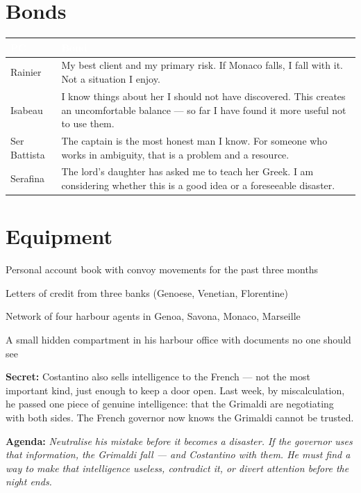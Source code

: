 \section*{Bonds}
\begin{table}[h]\centering\renewcommand{\arraystretch}{1.4}
\begin{tabularx}{\linewidth}{@{}L{2.6cm} X@{}}
\toprule{}
\textcolor{white}{\textbf{PC}} & \textcolor{white}{\textbf{Bond}} \\
\midrule
Rainier & My best client and my primary risk. If Monaco falls, I fall with it. Not a situation I enjoy. \\
Isabeau & I know things about her I should not have discovered. This creates an uncomfortable balance --- so far I have found it more useful not to use them. \\
Ser Battista & The captain is the most honest man I know. For someone who works in ambiguity, that is a problem and a resource. \\
Serafina & The lord's daughter has asked me to teach her Greek. I am considering whether this is a good idea or a foreseeable disaster. \\
\bottomrule
\end{tabularx}
\end{table}

\section*{Equipment}
\begin{goldlist}
\item Personal account book with convoy movements for the past three months
\item Letters of credit from three banks (Genoese, Venetian, Florentine)
\item Network of four harbour agents in Genoa, Savona, Monaco, Marseille
\item A small hidden compartment in his harbour office with documents no one should see
\end{goldlist}

\clearpage
\begin{secretbox}
\textbf{Secret:} Costantino also sells intelligence to the French --- not the most
important kind, just enough to keep a door open. Last week, by miscalculation, he
passed one piece of genuine intelligence: that the Grimaldi are negotiating with both
sides. The French governor now knows the Grimaldi cannot be trusted.

\medskip\noindent\textcolor{SecretRed}{\textbf{Agenda:}} \textit{Neutralise his
mistake before it becomes a disaster. If the governor uses that information, the
Grimaldi fall --- and Costantino with them. He must find a way to make that
intelligence useless, contradict it, or divert attention before the night ends.}
\end{secretbox}

